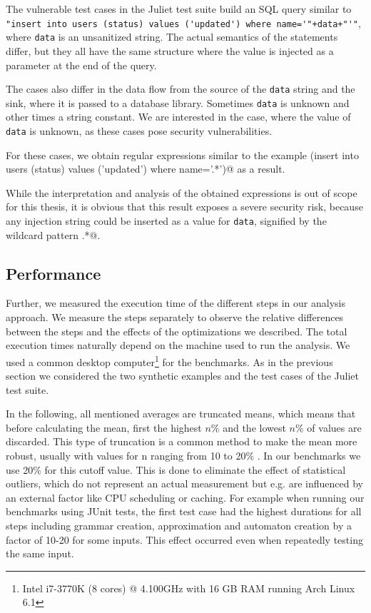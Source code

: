 The vulnerable test cases in the Juliet test suite build an SQL query similar to \lstinline|"insert into users (status) values ('updated') where name='"+data+"'"|, where \lstinline|data| is an unsanitized string. The actual semantics of the statements differ, but they all have the same structure where the value is injected as a parameter at the end of the query.

The cases also differ in the data flow from the source of the \lstinline|data| string and the sink, where it is passed to a database library. Sometimes \lstinline|data| is unknown and other times a string constant. We are interested in the case, where the value of \lstinline|data| is unknown, as these cases pose security vulnerabilities.

For these cases, we obtain regular expressions similar to the example \Verb@(insert into users (status) values ('updated') where name='.*')@ as a result.

While the interpretation and analysis of the obtained expressions is out of scope for this thesis, it is obvious that this result exposes a severe security risk, because any injection string could be inserted as a value for \lstinline|data|, signified by the wildcard pattern \Verb@.*@.

\subsection{Performance}\label{sec:eval:peformance}

Further, we measured the execution time of the different steps in our analysis approach. 
We measure the steps separately to observe the relative differences between the steps and the effects of the optimizations we described. The total execution times naturally depend on the machine used to run the analysis. We used a common desktop computer\footnote{Intel i7-3770K (8 cores) @ 4.100GHz with 16 GB RAM running Arch Linux 6.1} for the benchmarks.
As in the previous section we considered the two synthetic examples and the test cases of the Juliet test suite. 

In the following, all mentioned averages are truncated means, which means that before calculating the mean, first the highest $n\%$ and the lowest $n\%$ of values are discarded. This type of truncation is a common method to make the mean more robust, usually with values for n ranging from 10 to 20\% \cite{krenel}. In our benchmarks we use 20\% for this cutoff value. This is done to eliminate the effect of statistical outliers, which do not represent an actual measurement but e.g. are influenced by an external factor like CPU scheduling or caching. For example when running our benchmarks using JUnit tests, the first test case had the highest durations for all steps including grammar creation, approximation and automaton creation by a factor of 10-20 for some inputs. This effect occurred even when repeatedly testing the same input.

